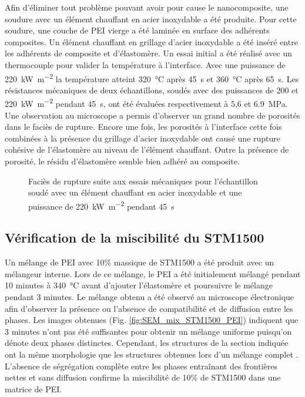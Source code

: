 Afin d'éliminer tout problème pouvant avoir pour cause le nanocomposite, une soudure avec un élément chauffant en acier inoxydable a été produite. 
Pour cette soudure, une couche de PEI vierge a été laminée en surface des adhérents composites.
Un élément chauffant en grillage d'acier inoxydable a été inséré entre les adhérents de composite et d'élastomère. 
Un essai initial a été réalisé avec un thermocouple pour valider la température à l'interface. 
Avec une puissance de \SI{220}{\kilo\watt\per\square\metre} la température atteint \SI{320}{\celsius} après \SI{45}{\second} et \SI{360}{\celsius} après \SI{65}{\second}. 
Les résistances mécaniques de deux échantillons, soudés avec des puissances de 200 et \SI{220}{\kilo\watt\per\square\metre} pendant \SI{45}{\second}, ont été évaluées respectivement à 5,6 et \SI{6,9}{\mega\pascal}. 
Une observation au microscope a permis d'observer un grand nombre de porosités dans le faciès de rupture. 
Encore une fois, les porosités à l'interface cette fois combinées à la présence du grillage d'acier inoxydable ont causé une rupture cohésive de l'élastomère au niveau de l'élément chauffant. 
Outre la présence de porosité, le résidu d'élastomère semble bien adhéré au composite.  

\begin{figure}[h]
	\centering
	 \qquad
	\caption{Faciès de rupture suite aux essais mécaniques pour l'échantillon soudé avec un élément chauffant en acier inoxydable et une puissance de \SI{220}{\kilo\watt\per\square\metre} pendant \SI{45}{\second}}
	\label{fig:STM1500_facies_soudure_SS}
\end{figure}

\subsection{Vérification de la miscibilité du STM1500}

Un mélange de PEI avec 10\% massique de STM1500 a été produit avec un mélangeur interne. 
Lors de ce mélange, le PEI a été initialement mélangé pendant 10 minutes à \SI{340}{\celsius} avant d'ajouter l'élastomère et poursuivre le mélange pendant 3 minutes. 
Le mélange obtenu a été observé au microscope électronique afin d'observer la présence ou l'absence de compatibilité et de diffusion entre les phases. 
Les images obtenues (Fig. \ref{fig:SEM_mix_STM1500_PEI}) indiquent que 3 minutes n'ont pas été suffisantes pour obtenir un mélange uniforme puisqu'on dénote deux phases distinctes. 
Cependant, les structures de la section indiquée ont la même morphologie que les structures obtenues lors d'un mélange complet \cite{Hatui2015}. 
L'absence de ségrégation complète entre les phases entraînant des frontières nettes et sans diffusion confirme la miscibilité de 10\% de STM1500 dans une matrice de PEI. 

